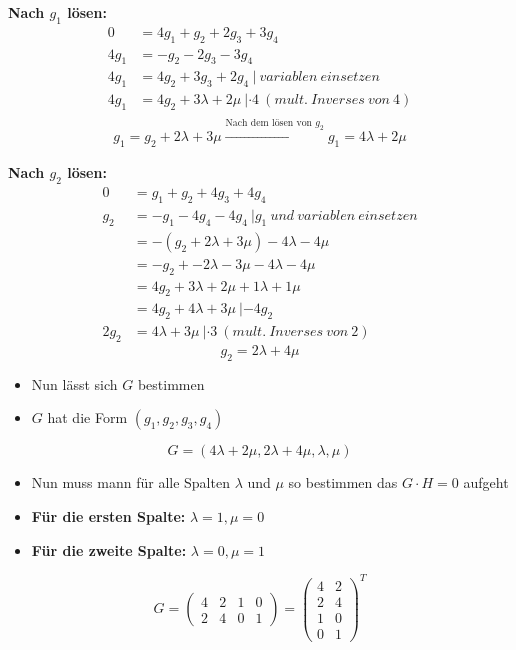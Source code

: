 \textbf{Nach $g_1$ lösen:}
\begin{align*}
0 &= 4g_1 + g_2 + 2g_3 + 3g_4\\
4g_1 &= -g_2 -2g_3 -3g_4\\
4g_1 &= 4g_2 + 3g_3 + 2g_4 \ | \ variablen \ einsetzen\\
4g_1 &= 4g_2 + 3\lambda + 2\mu \ | \cdot 4 \ (mult. \ Inverses \ von \ 4)\\
\end{align*}
$$
\boxed{g_1 = g_2 + 2\lambda + 3\mu} \xrightarrow[]{\text{Nach dem lösen von } g_2} \boxed{g_1 = 4\lambda + 2\mu}
$$

\textbf{Nach $g_2$ lösen:}
\begin{align*}
0 &= g_1 + g_2 + 4g_3 + 4g_4\\
g_2 &= -g_1 - 4g_4 - 4g_4 \ | g_1 \ und \ variablen \ einsetzen\\
&= -(g_2 + 2\lambda + 3\mu) - 4\lambda - 4\mu\\
&= -g_2 + -2\lambda -3\mu - 4\lambda - 4\mu\\
&= 4g_2 + 3 \lambda + 2\mu + 1 \lambda + 1\mu\\
&= 4g_2 + 4 \lambda + 3 \mu \ | -4g_2\\
2g_2 &= 4 \lambda + 3 \mu \ | \cdot 3 \ (mult. \ Inverses \ von \ 2)
\end{align*}
$$
\boxed{g_2 = 2\lambda + 4\mu}
$$

\begin{itemize}
\item Nun lässt sich $G$ bestimmen
\item $G$ hat die Form $(g_1, g_2, g_3, g_4)$
\end{itemize}
$$
G = (4\lambda + 2\mu, 2\lambda + 4\mu, \lambda, \mu)
$$

\begin{itemize}
\item Nun muss mann für alle Spalten $\lambda$ und $\mu$ so bestimmen das $G\cdot H = 0$ aufgeht
\item \textbf{Für die ersten Spalte:} $\lambda = 1, \mu = 0$
\item \textbf{Für die zweite Spalte:} $\lambda = 0, \mu = 1$
\end{itemize}
$$
G = \begin{pmatrix}
4 & 2 & 1 & 0\\
2 & 4 & 0 & 1
\end{pmatrix} = \begin{pmatrix}
4 & 2\\
2 & 4\\
1 & 0\\
0 & 1
\end{pmatrix}^T
$$